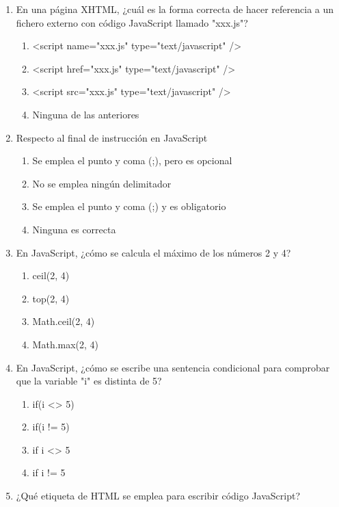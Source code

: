 \documentclass[addpoints, 12]{exam}
\begin{document}
\begin{enumerate}
\item En una página XHTML, ¿cuál es la forma correcta de hacer referencia a un fichero externo con código JavaScript llamado "xxx.js"?

\begin{enumerate}
\item <script name="xxx.js" type="text/javascript" />
\item <script href="xxx.js" type="text/javascript" />
\item <script src="xxx.js" type="text/javascript" />
\item Ninguna de las anteriores
\end{enumerate}

\item Respecto al final de instrucción en JavaScript

\begin{enumerate}
\item Se emplea el punto y coma (;), pero es opcional
\item No se emplea ningún delimitador
\item Se emplea el punto y coma (;) y es obligatorio
\item Ninguna es correcta
\end{enumerate}

\item En JavaScript, ¿cómo se calcula el máximo de los números 2 y 4?

\begin{enumerate}
\item ceil(2, 4)
\item top(2, 4)
\item Math.ceil(2, 4)
\item Math.max(2, 4)
\end{enumerate}

\item En JavaScript, ¿cómo se escribe una sentencia condicional para comprobar que la variable "i" es distinta de 5?

\begin{enumerate}
\item if(i <> 5)
\item if(i != 5)
\item if i <> 5
\item if i != 5
\end{enumerate}

\item ¿Qué etiqueta de HTML se emplea para escribir código JavaScript?


\end{enumerate}
\end{document}
